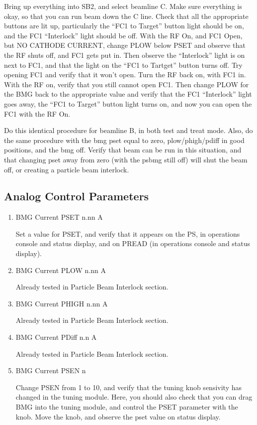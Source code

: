 \documentclass[11pt]{book}		%
\begin{document}
\color{red}

Bring up everything into SB2, and select beamline C. Make sure everything is okay, so that you can run beam down the C line. Check that all the appropriate buttons are lit up, particularly the ``FC1 to Target'' button light should be on, and the FC1 ``Interlock'' light should be off. With the RF On, and FC1 Open, but NO CATHODE CURRENT, change PLOW below PSET and observe that the RF shuts off, and FC1 gets put in. Then observe the ``Interlock'' light is on next to FC1, and that the light on the ``FC1 to Tartget'' button turns off. Try opening FC1 and verify that it won't open. Turn the RF back on, with FC1 in. With the RF on, verify that you still cannot open FC1. Then change PLOW for the BMG back to the appropriate value and verify that the FC1 ``Interlock'' light goes away, the ``FC1 to Target'' button light turns on, and now you can open the FC1 with the RF On.

Do this identical procedure for beamline B, in both test and treat mode. Also, do the same procedure with the bmg pset equal to zero, plow/phigh/pdiff in good positions, and the bmg off. Verify that beam can be run in this situation, and that changing pset away from zero (with the psbmg still off) will shut the beam off, or creating a particle beam interlock.

\color{black}

\subsection{Analog Control Parameters}

\begin{enumerate}
 \item BMG Current PSET  n.nn A

\color{red}
Set a value for PSET, and verify that it appears on the PS, in operations console and status display, and on PREAD (in operations console and status display).
\color{black}

 \item BMG Current PLOW  n.nn A

\color{red}
Already tested in Particle Beam Interlock section.
\color{black}

 \item BMG Current PHIGH n.nn A

\color{red}
Already tested in Particle Beam Interlock section.
\color{black}

 \item BMG Current PDiff n.n A

\color{red}
Already tested in Particle Beam Interlock section.
\color{black}

 \item BMG Current PSEN  n

\color{red}
Change PSEN from 1 to 10, and verify that the tuning knob sensivity has changed in the tuning module. Here, you should also check that you can drag BMG into the tuning module, and control the PSET parameter with the knob. Move the knob, and observe the pset value on status display.
\color{black}

\end{enumerate}
\end{document}
